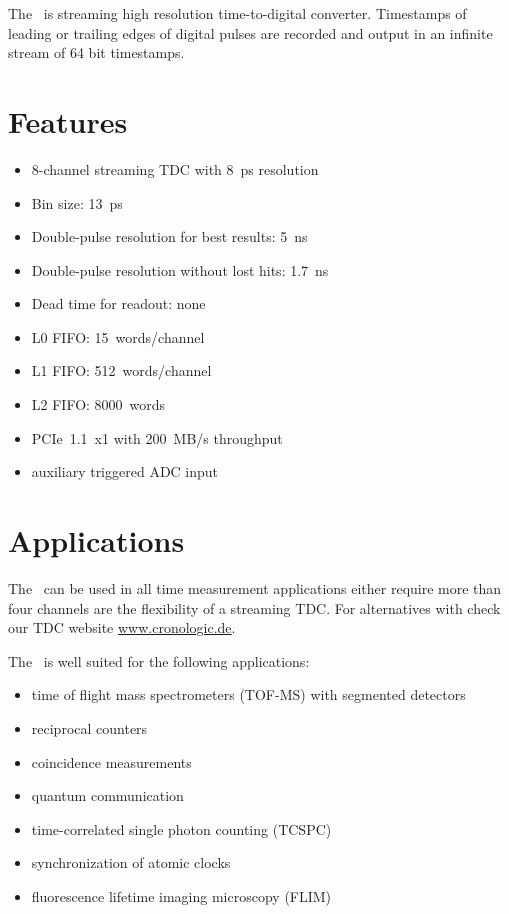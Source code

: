 The \deviceName\ is streaming high resolution time-to-digital converter. 
Timestamps of leading or trailing edges of digital pulses are recorded and output in an infinite stream of 64 bit timestamps.

\section{Features}
	\begin{itemize}
		\item 8-channel streaming TDC with 8~ps resolution
		\item Bin size: 13~ps
		\item Double-pulse resolution for best results: 5~ns
		\item Double-pulse resolution without lost hits: 1.7~ns
		\item Dead time for readout: none
		\item L0 FIFO: 15~words/channel
		\item L1 FIFO: 512~words/channel
		\item L2 FIFO: 8000~words
		\item PCIe~1.1~x1 with 200~MB/s throughput
		\item auxiliary triggered ADC input
	\end{itemize} 
\section{Applications}
The \deviceName\ can be used in all time measurement applications either require more than four channels are the flexibility of a streaming TDC. 
For alternatives with check our TDC website \href{https://www.cronologic.de/produkte/products-overview#tdcdata}{www.cronologic.de}.

The \deviceName\ is well suited for the following applications:
\begin{itemize}
	\item time of flight mass spectrometers (TOF-MS) with segmented detectors
	\item reciprocal counters
	\item coincidence measurements
	\item quantum communication
	\item time-correlated single photon counting (TCSPC)
	\item synchronization of atomic clocks
	\item fluorescence lifetime imaging microscopy (FLIM)
\end{itemize} 